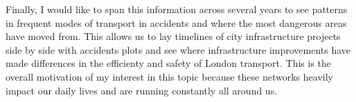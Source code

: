 \documentclass[
]{article}
\begin{document}
Finally, I would like to span this information across several years to
see patterns in frequent modes of transport in accidents and where the
most dangerous areas have moved from. This allows us to lay timelines of
city infrastructure projects side by side with accidents plots and see
where infrastructure improvements have made differences in the
efficienty and safety of London transport. This is the overall
motivation of my interest in this topic because these networks heavily
impact our daily lives and are running constantly all around us.
\end{document}
